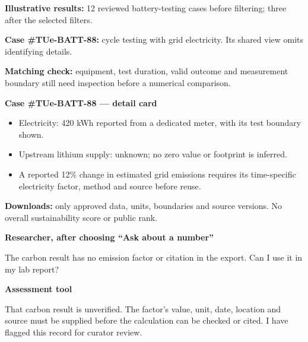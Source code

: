 \documentclass[11pt,a4paper]{article}
\begin{document}
\begin{queryscreen}
\textbf{Illustrative results:} 12 reviewed battery-testing cases before filtering; three after the selected filters.\par
\textbf{Case \#TUe-BATT-88:} cycle testing with grid electricity. Its shared view omits identifying details.\par
\textbf{Matching check:} equipment, test duration, valid outcome and measurement boundary still need inspection before a numerical comparison.\par\medskip
{}\quad
{}\quad
{}
\end{queryscreen}

\begin{queryscreen}
\textbf{Case \#TUe-BATT-88 --- detail card}\par
\begin{itemize}[nosep,leftmargin=1.5em]
  \item Electricity: 420 kWh reported from a dedicated meter, with its test boundary shown.
  \item Upstream lithium supply: unknown; no zero value or footprint is inferred.
  \item A reported 12\% change in estimated grid emissions requires its time-specific electricity factor, method and source before reuse.
\end{itemize}
\textbf{Downloads:} only approved data, units, boundaries and source versions. No overall sustainability score or public rank.\par\medskip
{}\quad
{}\quad
{}
\end{queryscreen}

\begin{flushright}\begin{queryuser}
\textbf{Researcher, after choosing ``Ask about a number''}\par
The carbon result has no emission factor or citation in the export. Can I use it in my lab report?
\end{queryuser}\end{flushright}

\begin{queryscreen}
\textbf{Assessment tool}\par
That carbon result is unverified. The factor's value, unit, date, location and source must be supplied before the calculation can be checked or cited. I have flagged this record for curator review.\par\medskip
{}\quad
{}\quad
{}
\end{queryscreen}
\end{document}
